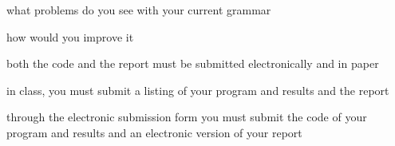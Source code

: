 \par
what problems do you see with your current grammar

\par
how would you improve it

\par
both the code and the report must be submitted electronically and in paper

\par
in class, you must submit a listing of your program and results and the report

\par
through the electronic submission form you must submit the code of your program and results and an electronic version of your report

\par
\normalsize
